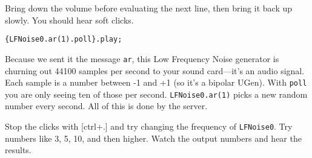 Bring down the volume before evaluating the next line, then bring it back up slowly. You should hear soft clicks.

\begin{lstlisting}[style=SuperCollider-IDE, basicstyle=\scttfamily\footnotesize]
{LFNoise0.ar(1).poll}.play;
\end{lstlisting}

Because we sent it the message \texttt{ar}, this Low Frequency Noise generator is churning out 44100 samples per second to your sound card---it's an audio signal. Each sample is a number between -1 and +1 (so it's a bipolar UGen). With \texttt{poll} you are only seeing ten of those per second. \texttt{LFNoise0.ar(1)} picks a new random number every second. All of this is done by the server.

Stop the clicks with [ctrl+.] and try changing the frequency of \texttt{LFNoise0}. Try numbers like 3, 5, 10, and then higher. Watch the output numbers and hear the results.